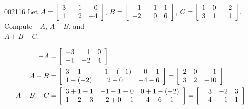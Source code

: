 \begin{example}{}{002116}
Let $A = \left[ \begin{array}{rrr}
3 & -1 & 0 \\
1 & 2 & -4
\end{array} \right]$, $B = \left[ \begin{array}{rrr}
1 & -1 & 1 \\
-2 & 0 & 6
\end{array} \right]$, $C = \left[ \begin{array}{rrr}
1 & 0 & -2 \\
3 & 1 & 1
\end{array} \right]$. Compute $-A$, $A - B$, and \\$A + B - C$.


\begin{solution}
\begin{align*}
-A &= \left[ \begin{array}{rrr}
-3 & 1 & 0 \\
-1 & -2 & 4
\end{array} \right] \\
A - B &= \left[ \begin{array}{lcr}
3 - 1 & -1 - (-1) & 0 - 1 \\
1 - (-2) & 2 - 0 & -4 - 6
\end{array} \right] = \left[ \begin{array}{rrr}
2 & 0 & -1 \\
3 & 2 & -10
\end{array} \right] \\
A + B - C &= \left[ \begin{array}{rrl}
3 + 1 - 1 & -1 - 1 - 0 & 0 + 1 -(-2) \\
1 - 2 - 3 & 2 + 0 - 1 & -4 + 6 -1
\end{array} \right] = \left[ \begin{array}{rrr}
3 & -2 & 3 \\
-4 & 1 & 1
\end{array} \right]
\end{align*}
\end{solution}
\end{example}

